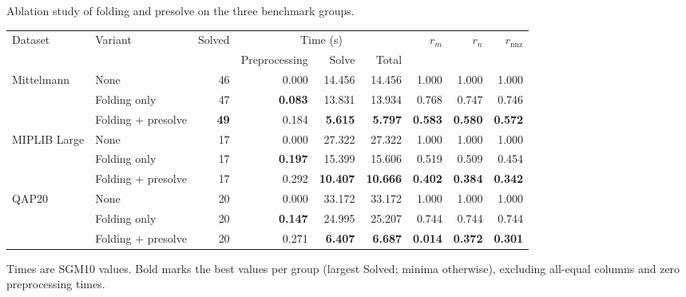\begin{table}[htbp]
\TABLE
{Ablation study of folding and presolve on the three
benchmark groups.\label{tab:ablation-components}}
{\begin{tabularx}{\linewidth}{@{}l>{\raggedright\arraybackslash}Xrrrrrrr@{}}
\toprule
Dataset & Variant & Solved & \multicolumn{3}{c}{Time (s)}
& \(r_m\) & \(r_n\) & \(r_{\mathrm{nnz}}\) \\
\cmidrule(lr){4-6}
& & & Preprocessing & Solve & Total & & & \\
\midrule
Mittelmann
& None
& 46 & 0.000 & 14.456 & 14.456 & 1.000 & 1.000 & 1.000 \\
& Folding only
& 47 & \textbf{0.083} & 13.831 & 13.934 & 0.768 & 0.747 & 0.746 \\
& Folding + presolve
& \textbf{49} & 0.184 & \textbf{5.615} & \textbf{5.797} & \textbf{0.583} & \textbf{0.580} & \textbf{0.572} \\
\midrule
MIPLIB Large
& None
& 17 & 0.000 & 27.322 & 27.322 & 1.000 & 1.000 & 1.000 \\
& Folding only
& 17 & \textbf{0.197} & 15.399 & 15.606 & 0.519 & 0.509 & 0.454 \\
& Folding + presolve
& 17 & 0.292 & \textbf{10.407} & \textbf{10.666} & \textbf{0.402} & \textbf{0.384} & \textbf{0.342} \\
\midrule
QAP20
& None
& 20 & 0.000 & 33.172 & 33.172 & 1.000 & 1.000 & 1.000 \\
& Folding only
& 20 & \textbf{0.147} & 24.995 & 25.207 & 0.744 & 0.744 & 0.744 \\
& Folding + presolve
& 20 & 0.271 & \textbf{6.407} & \textbf{6.687} & \textbf{0.014} & \textbf{0.372} & \textbf{0.301} \\
\bottomrule
\end{tabularx}}
{Times are SGM10 values. Bold marks the best values per group
(largest Solved; minima otherwise), excluding all-equal columns and zero
preprocessing times.}
\end{table}
